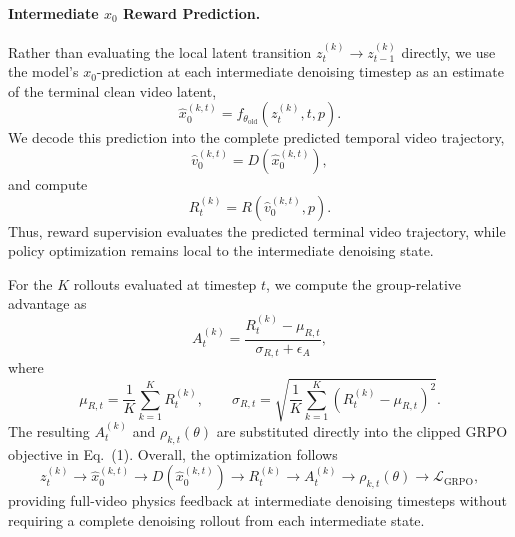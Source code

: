 \documentclass{article}
\begin{document}
\paragraph{Intermediate $x_0$ Reward Prediction.}
Rather than evaluating the local latent transition
$z_t^{(k)}\rightarrow z_{t-1}^{(k)}$ directly, we use the model's
$x_0$-prediction at each intermediate denoising timestep as an estimate
of the terminal clean video latent,
\begin{equation}
\hat{x}_0^{(k,t)}
=
f_{\theta_{\mathrm{old}}}
\left(
z_t^{(k)},t,p
\right).
\end{equation}
We decode this prediction into the complete predicted temporal video
trajectory,
\begin{equation}
\hat{v}_0^{(k,t)}
=
D\left(\hat{x}_0^{(k,t)}\right),
\end{equation}
and compute
\begin{equation}
R_t^{(k)}
=
R\left(\hat{v}_0^{(k,t)},p\right).
\end{equation}
Thus, reward supervision evaluates the predicted terminal video
trajectory, while policy optimization remains local to the intermediate
denoising state.

For the $K$ rollouts evaluated at timestep $t$, we compute the
group-relative advantage as
\begin{equation}
A_t^{(k)}
=
\frac{
R_t^{(k)}-\mu_{R,t}
}{
\sigma_{R,t}+\epsilon_A
},
\end{equation}
where
\begin{equation}
\mu_{R,t}
=
\frac{1}{K}\sum_{k=1}^{K}R_t^{(k)},
\qquad
\sigma_{R,t}
=
\sqrt{
\frac{1}{K}
\sum_{k=1}^{K}
\left(R_t^{(k)}-\mu_{R,t}\right)^2
}.
\end{equation}
The resulting $A_t^{(k)}$ and $\rho_{k,t}(\theta)$ are substituted
directly into the clipped GRPO objective in Eq.~(1). Overall, the
optimization follows
\begin{equation}
z_t^{(k)}
\rightarrow
\hat{x}_0^{(k,t)}
\rightarrow
D(\hat{x}_0^{(k,t)})
\rightarrow
R_t^{(k)}
\rightarrow
A_t^{(k)}
\rightarrow
\rho_{k,t}(\theta)
\rightarrow
\mathcal{L}_{\mathrm{GRPO}},
\end{equation}
providing full-video physics feedback at intermediate denoising
timesteps without requiring a complete denoising rollout from each
intermediate state.
\end{document}
